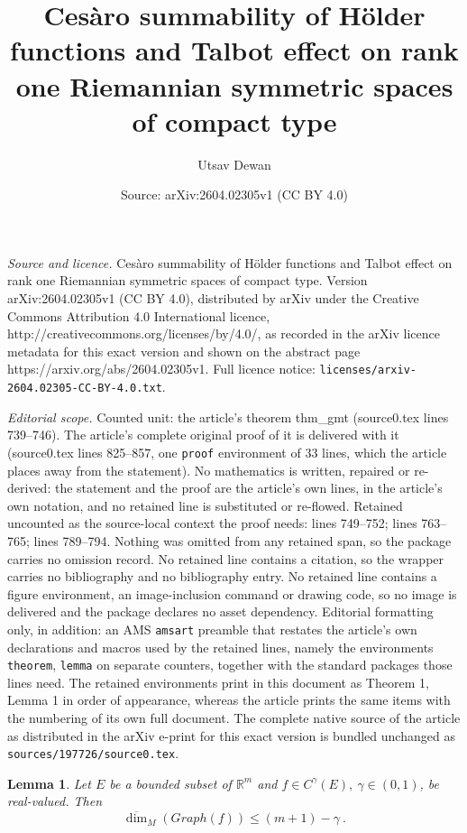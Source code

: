 \documentclass[10pt,a4paper]{amsart}
\title{Ces\`aro summability of H\"older functions and Talbot effect on rank one Riemannian symmetric spaces of compact type}
\author{Utsav Dewan}
\date{Source: arXiv:2604.02305v1 (CC BY 4.0)}
\newtheorem{lemma}{Lemma}
\newcommand{\R}{\mathbb R}%
\begin{document}
\maketitle

\noindent\emph{Source and licence.} Ces\`aro summability of H\"older functions and Talbot effect on rank one Riemannian symmetric spaces of compact type. Version arXiv:2604.02305v1 (CC BY 4.0), distributed by arXiv under the Creative Commons Attribution 4.0 International licence, http://creativecommons.org/licenses/by/4.0/, as recorded in the arXiv licence metadata for this exact version and shown on the abstract page https://arxiv.org/abs/2604.02305v1. Full licence notice: \texttt{licenses/arxiv-2604.02305-CC-BY-4.0.txt}.\par\smallskip

\noindent\textit{Editorial scope.} Counted unit: the article's theorem thm\_gmt (source0.tex lines 739--746). The article's complete original proof of it is delivered with it (source0.tex lines 825--857, one \texttt{proof} environment of 33 lines, which the article places away from the statement). No mathematics is written, repaired or re-derived: the statement and the proof are the article's own lines, in the article's own notation, and no retained line is substituted or re-flowed.  Retained uncounted as the source-local context the proof needs: lines 749--752; lines 763--765; lines 789--794.  Nothing was omitted from any retained span, so the package carries no omission record.  No retained line contains a citation, so the wrapper carries no bibliography and no bibliography entry.  No retained line contains a figure environment, an image-inclusion command or drawing code, so no image is delivered and the package declares no asset dependency.  Editorial formatting only, in addition: an AMS \texttt{amsart} preamble that restates the article's own declarations and macros used by the retained lines, namely the environments \texttt{theorem}, \texttt{lemma} on separate counters, together with the standard packages those lines need.  The retained environments print in this document as Theorem 1, Lemma 1 in order of appearance, whereas the article prints the same items with the numbering of its own full document.  The complete native source of the article as distributed in the arXiv e-print for this exact version is bundled unchanged as \texttt{sources/197726/source0.tex}.
\begin{lemma} \label{gmt_lemma3}
Let $E$ be a bounded subset of $\R^m$ and $f \in C^\gamma(E),\: \gamma \in (0,1)$, be real-valued. Then 
$$\overline{\dim}_M\left(Graph(f)\right) \le (m+1)-\gamma\:.$$
\end{lemma}
\end{document}
